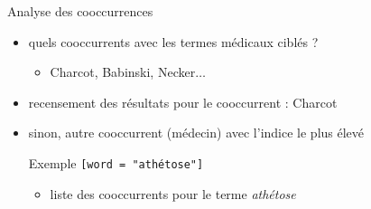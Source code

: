 \documentclass[xcolor={table,usenames,dvipsnames}]{beamer}
\let\olditem\item
\renewcommand{\item}{%
\olditem\vspace{0pt}}
\begin{document}
\begin{frame}{Analyse des cooccurrences}
\begin{itemize}
	\item quels cooccurrents avec les termes médicaux ciblés ? 
	\begin{itemize}
		\item Charcot, Babinski, Necker$\dots$
	\end{itemize}
	\item recensement des résultats pour le cooccurrent : Charcot
	\item sinon, autre cooccurrent (médecin) avec l'indice le plus élevé\\
	\begin{alertblock}{Exemple}
		\texttt{[word = "athétose"]} 
		\begin{itemize}
			\item liste des cooccurrents pour le terme \textit{athétose}
		\end{itemize}
	\end{alertblock}
\end{itemize}
\end{frame}
\end{document}
